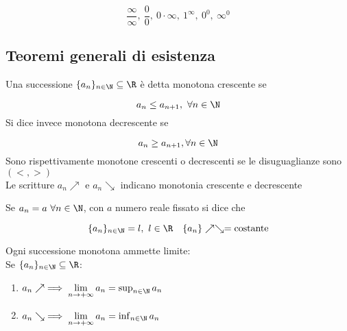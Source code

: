 \documentclass[../analisi.tex]{subfiles}
\begin{document}
\begin{equation} 
	\frac{\infty}{\infty},\  \frac{0}{0},\ 
	0 \cdot \infty,\ 1^{\infty},\
	0^0,\ \infty^0
\end{equation}

\subsection{Teoremi generali di esistenza}
Una successione $\{ a_n \}_{n \in \N} \subseteq \R$ è detta monotona crescente se 


\begin{equation}
	a_n \leq a_{ n + 1 },\  \forall n \in \N 
\end{equation}
Si dice invece monotona decrescente se


\begin{equation}
	a_n \geq a_{ n + 1}, \forall n \in \N
\end{equation}
Sono rispettivamente  monotone crescenti o decrescenti 
se le disuguaglianze sono  $ ( <, >) $\\
Le scritture $ a_n \nearrow$ e $ a_n \searrow $ indicano monotonia crescente e decrescente  

\begin{defn}
Se $ a_n = a \ \forall n \in \N$, con $a$ numero reale fissato si dice che 


\begin{equation}
	\{ a_n \}_{n \in \N} = l,\ l \in \R \quad 
	\{ a_n \} \nearrow \searrow = \mbox{costante}
\end{equation}

\end{defn}

\begin{defn}
Ogni successione monotona ammette limite: \\
Se $ \{ a_n \}_{n \in \N} \subseteq \R $:

\begin{enumerate}
	\item $ a_n \nearrow \implies \lim \limits_{n \to + \infty} a_n = 
	\sup_{n \in \N} a_n$
	\item $ a_n \searrow \implies \lim \limits_{n \to + \infty} a_n =
	\inf_{n \in \N} a_n $
\end{enumerate}
\end{defn}
\end{document}
